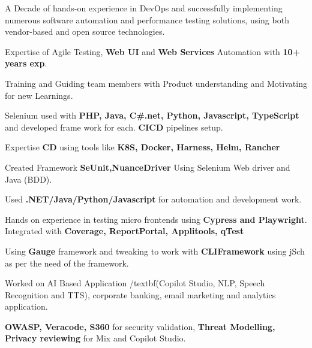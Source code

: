 

\begin{cventries}
\begin{cvitemize}
 \item {A Decade of hands-on experience in DevOps and successfully implementing numerous software automation and performance testing solutions, using both vendor-based and open source technologies.}
 \item {Expertise of Agile Testing, \textbf{Web UI} and \textbf{Web Services} Automation with \textbf{10+ years exp}.}
 \item {Training and Guiding team members with Product understanding and Motivating for new Learnings.}
 \item {Selenium used with \textbf{PHP, Java, C\#.net, Python, Javascript, TypeScript} and developed frame work for each. \textbf{CICD} pipelines setup.}
 \item {Expertise \textbf{CD} using tools like \textbf{K8S, Docker, Harness, Helm, Rancher}}
 \item {Created Framework \textbf{SeUnit,NuanceDriver} Using Selenium Web driver and Java (BDD).}
 \item { Used \textbf{.NET/Java/Python/Javascript} for automation and development work.}
 \item {Hands on experience in testing micro frontends using \textbf{Cypress and Playwright}. Integrated with \textbf{Coverage, ReportPortal, Applitools, qTest}} 

 \item {Using \textbf{Gauge} framework and tweaking to work with \textbf{CLIFramework} using jSch as per the need of the framework.}

 \item {Worked on AI Based Application /textbf{(Copilot Studio, NLP, Speech Recognition and TTS)}, corporate banking, email marketing and analytics application.}

 \item {\textbf{OWASP, Veracode, S360} for security validation, \textbf{Threat Modelling, Privacy reviewing} for Mix and Copilot Studio.}


\end{cvitemize}
\end{cventries}
